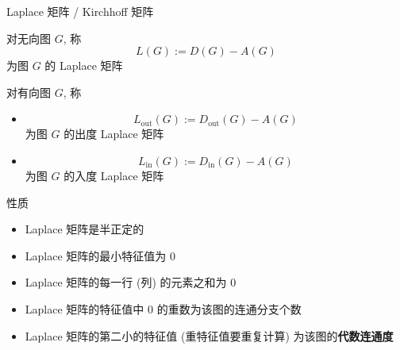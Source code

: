 \begin{frame}[fragile]{Laplace 矩阵 / Kirchhoff 矩阵}
	\begin{definition}
		对无向图 \(G\), 称
		\[
			L(G):=D(G)-A(G)
		\]
		为图 \(G\) 的 Laplace 矩阵
	\end{definition}

	\begin{definition}
		对有向图 \(G\), 称
		\begin{itemize}
			\item \[
				      L_{\text{out}}(G):=D_{\text{out}}(G)-A(G)
			      \]
			      为图 \(G\) 的出度 Laplace 矩阵
			\item \[
				      L_{\text{in}}(G):=D_{\text{in}}(G)-A(G)
			      \]
			      为图 \(G\) 的入度 Laplace 矩阵
		\end{itemize}
	\end{definition}
\end{frame}


\begin{frame}[fragile]{性质}
	\begin{itemize}
		\item Laplace 矩阵是半正定的
		\item Laplace 矩阵的最小特征值为 0
		\item Laplace 矩阵的每一行 (列) 的元素之和为 0
		\item Laplace 矩阵的特征值中 0 的重数为该图的连通分支个数
		\item Laplace 矩阵的第二小的特征值 (重特征值要重复计算) 为该图的\textbf{代数连通度}
	\end{itemize}
\end{frame}
